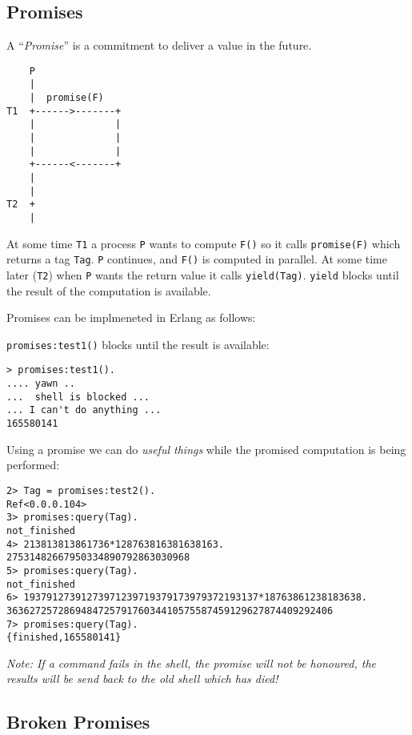 \documentclass[10pt]{article}
\begin{document}
\subsection{Promises}

A ``{\sl Promise}'' is a commitment to deliver a value in the future.

\begin{verbatim}
    P 
    |
    |  promise(F)  
T1  +------>-------+
    |              |
    |              | 
    |              |
    +------<-------+
    |
    |
T2  +
    |
\end{verbatim}

At some time \verb+T1+ a process \verb+P+ wants to compute \verb+F()+ so it calls
\verb+promise(F)+ which returns a tag \verb+Tag+. \verb+P+ continues,
and \verb+F()+ is computed in parallel. At some time later (\verb+T2+) when 
\verb+P+ wants the return value it calls \verb+yield(Tag)+. \verb+yield+ blocks until
the result of the computation is available.

Promises can be implmeneted in Erlang as follows:


\verb+promises:test1()+ blocks until the result is available:

\begin{Verbatim}
> promises:test1().
.... yawn .. 
...  shell is blocked ...
... I can't do anything ...
165580141
\end{Verbatim}

Using a promise we can do {\sl useful things} \textregistered{} while
the promised computation is being performed:

\begin{Verbatim}
2> Tag = promises:test2().
Ref<0.0.0.104>
3> promises:query(Tag).
not_finished
4> 213813813861736*128763816381638163.
27531482667950334890792863030968
5> promises:query(Tag).               
not_finished
6> 19379127391273971239719379173979372193137*18763861238183638.
363627257286948472579176034410575587459129627874409292406
7> promises:query(Tag).                                        
{finished,165580141}
\end{Verbatim}

{\sl Note: If a command fails in the shell, the promise will not
be honoured, the results will be send back to the old shell which has died!}

\subsection{Broken Promises}
\end{document}
